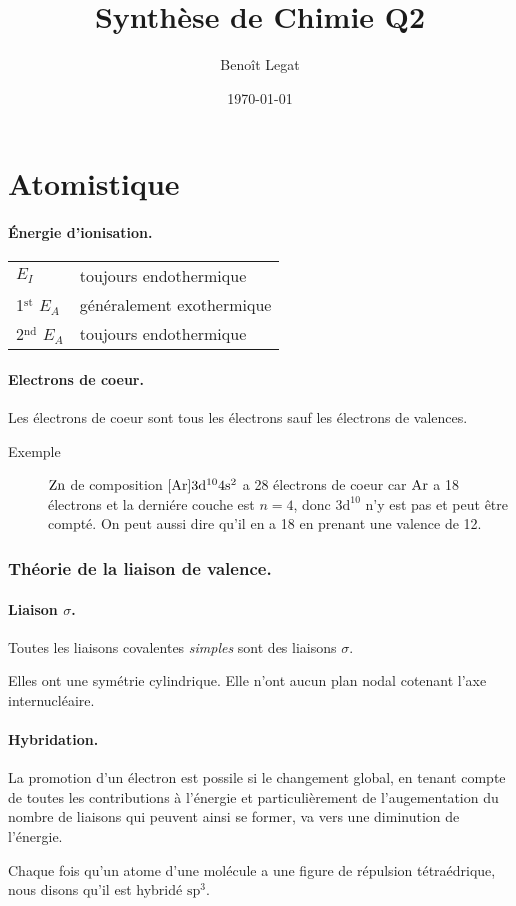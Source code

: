\documentclass[11pt,a4paper,french]{article}
\title{Synthèse de Chimie Q2}
\author{Beno\^it Legat}
\date{\today}
\begin{document}
\newcommand\sorb{\mathrm{s}}
\newcommand\porb{\mathrm{p}}
\newcommand\dorb{\mathrm{d}}

\maketitle
\part{Atomistique}

\subsection{\'Energie d'ionisation.}
\begin{tabular}{ll}
	$E_I$ & toujours endothermique\\
	1$^{\mathrm{st}}$ $E_A$ & g\'en\'eralement exothermique\\
	2$^{\mathrm{nd}}$ $E_A$ & toujours endothermique
\end{tabular}

\subsection{Electrons de coeur.}
Les \'electrons de coeur sont tous les \'electrons sauf les \'electrons de valences.

\begin{description}
	\item[Exemple]
		$\ce{Zn}$ de composition $[\ce{Ar}]3\dorb^{10}4\sorb^{2}$
		a 28 \'electrons de coeur car $\ce{Ar}$ a 18 \'electrons
		et la derni\'ere couche est $n=4$,
		donc $3\dorb^{10}$ n'y est pas et peut \^etre compt\'e.
		On peut aussi dire qu'il en a 18 en prenant une valence de 12.
\end{description}

\section{Th\'eorie de la liaison de valence.}
\subsection{Liaison $\sigma$.}
Toutes les liaisons covalentes {\it simples} sont des liaisons $\sigma$.

Elles ont une sym\'etrie cylindrique.
Elle n'ont aucun plan nodal cotenant l'axe internucl\'eaire.

\subsection{Hybridation.}

La promotion d'un \'electron est possile si le changement global, en tenant compte de toutes les contributions \`a l'\'energie et particuli\`erement de l'augementation du nombre de liaisons qui peuvent ainsi se former, va vers une diminution de l'\'energie.

Chaque fois qu'un atome d'une mol\'ecule a une figure de r\'epulsion t\'etra\'edrique, nous disons qu'il est hybrid\'e $\sorb\porb^3$.
\end{document}
